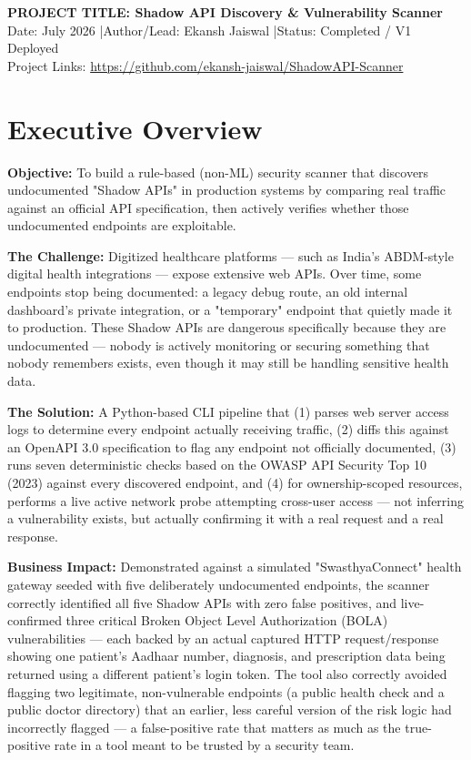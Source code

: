 \documentclass[11pt]{article}
\newcommand{\sublabel}[1]{\textcolor{accent}{\textbf{#1}}}
\begin{document}
\begin{center}
    {\Large \textbf{\textcolor{accent}{PROJECT TITLE: Shadow API Discovery \& Vulnerability Scanner}}} \\[0.5em]
    Date: July 2026 \quad|\quad Author/Lead: Ekansh Jaiswal \quad|\quad Status: Completed / V1 Deployed \\[0.5em]
    Project Links: \href{https://github.com/ekansh-jaiswal/ShadowAPI-Scanner}{https://github.com/ekansh-jaiswal/ShadowAPI-Scanner}
\end{center}

\vspace{1em}

\section{Executive Overview}

\sublabel{Objective:} To build a rule-based (non-ML) security scanner that discovers undocumented "Shadow APIs" in production systems by comparing real traffic against an official API specification, then actively verifies whether those undocumented endpoints are exploitable.

\sublabel{The Challenge:} Digitized healthcare platforms --- such as India's ABDM-style digital health integrations --- expose extensive web APIs. Over time, some endpoints stop being documented: a legacy debug route, an old internal dashboard's private integration, or a "temporary" endpoint that quietly made it to production. These Shadow APIs are dangerous specifically because they are undocumented --- nobody is actively monitoring or securing something that nobody remembers exists, even though it may still be handling sensitive health data.

\sublabel{The Solution:} A Python-based CLI pipeline that (1) parses web server access logs to determine every endpoint actually receiving traffic, (2) diffs this against an OpenAPI 3.0 specification to flag any endpoint not officially documented, (3) runs seven deterministic checks based on the OWASP API Security Top 10 (2023) against every discovered endpoint, and (4) for ownership-scoped resources, performs a live active network probe attempting cross-user access --- not inferring a vulnerability exists, but actually confirming it with a real request and a real response.

\sublabel{Business Impact:} Demonstrated against a simulated "SwasthyaConnect" health gateway seeded with five deliberately undocumented endpoints, the scanner correctly identified all five Shadow APIs with zero false positives, and live-confirmed three critical Broken Object Level Authorization (BOLA) vulnerabilities --- each backed by an actual captured HTTP request/response showing one patient's Aadhaar number, diagnosis, and prescription data being returned using a different patient's login token. The tool also correctly avoided flagging two legitimate, non-vulnerable endpoints (a public health check and a public doctor directory) that an earlier, less careful version of the risk logic had incorrectly flagged --- a false-positive rate that matters as much as the true-positive rate in a tool meant to be trusted by a security team.
\end{document}
